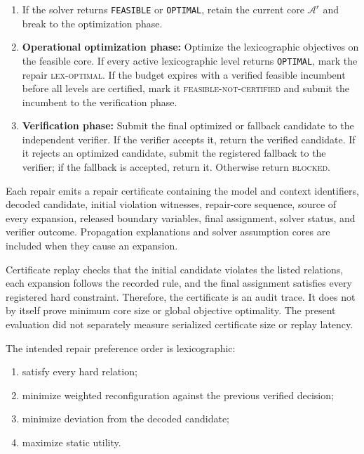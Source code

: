 \documentclass[pdflatex,sn-mathphys-num,iicol,oneside]{sn-jnl}
\newenvironment{algsteps}
  {\begin{enumerate}[
      leftmargin=1.8em,
      itemsep=1pt,
      parsep=0pt,
      topsep=2pt,
      label=\arabic*:
    ]}
  {\end{enumerate}}
\begin{document}
\begin{algorithm}[H]
\begin{algsteps}
\item If the solver returns \texttt{FEASIBLE} or \texttt{OPTIMAL}, retain the current core $\mathcal{A}^{r}$ and break to the optimization phase.

\item \textbf{Operational optimization phase:} Optimize the lexicographic objectives on the feasible core. If every active lexicographic level returns \texttt{OPTIMAL}, mark the repair \textsc{lex-optimal}. If the budget expires with a verified feasible incumbent before all levels are certified, mark it \textsc{feasible-not-certified} and submit the incumbent to the verification phase.

\item \textbf{Verification phase:} Submit the final optimized or fallback candidate to the independent verifier. If the verifier accepts it, return the verified candidate. If it rejects an optimized candidate, submit the registered fallback to the verifier; if the fallback is accepted, return it. Otherwise return \textsc{blocked}.

\end{algsteps}
\end{algorithm}

Each repair emits a repair certificate containing the model and
context identifiers, decoded candidate, initial violation witnesses,
repair-core sequence, source of every expansion, released boundary
variables, final assignment, solver status, and verifier outcome.
Propagation explanations and solver assumption cores are included
when they cause an expansion.

Certificate replay checks that the initial candidate violates the
listed relations, each expansion follows the recorded rule, and the
final assignment satisfies every registered hard constraint.
Therefore, the certificate is an audit trace. It does not by itself
prove minimum core size or global objective optimality. The present
evaluation did not separately measure serialized certificate size or
replay latency.

The intended repair preference order is lexicographic:

\begin{enumerate}
\item satisfy every hard relation;
\item minimize weighted reconfiguration against the previous verified
decision;
\item minimize deviation from the decoded candidate;
\item maximize static utility.
\end{enumerate}
\end{document}
